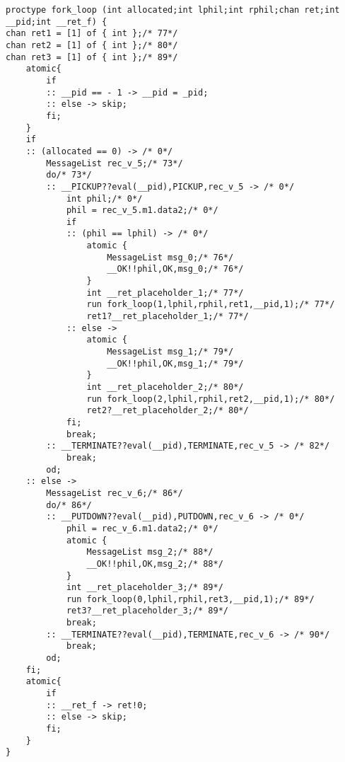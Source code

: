 \begin{lstlisting}[xleftmargin=.01\linewidth, xrightmargin=0.01\linewidth, caption={Dining Philosophers Promela translation.}, label={lst:promela_dp}]
proctype fork_loop (int allocated;int lphil;int rphil;chan ret;int __pid;int __ret_f) {
chan ret1 = [1] of { int };/* 77*/ 
chan ret2 = [1] of { int };/* 80*/ 
chan ret3 = [1] of { int };/* 89*/ 
	atomic{
		if
		:: __pid == - 1 -> __pid = _pid;
		:: else -> skip;
		fi;
	}
	if
	:: (allocated == 0) -> /* 0*/ 
		MessageList rec_v_5;/* 73*/ 
		do/* 73*/ 
		:: __PICKUP??eval(__pid),PICKUP,rec_v_5 -> /* 0*/ 
			int phil;/* 0*/ 
			phil = rec_v_5.m1.data2;/* 0*/ 
			if
			:: (phil == lphil) -> /* 0*/ 
				atomic {
					MessageList msg_0;/* 76*/ 
					__OK!!phil,OK,msg_0;/* 76*/ 
				}
				int __ret_placeholder_1;/* 77*/ 
				run fork_loop(1,lphil,rphil,ret1,__pid,1);/* 77*/ 
				ret1?__ret_placeholder_1;/* 77*/ 
			:: else -> 
				atomic {
					MessageList msg_1;/* 79*/ 
					__OK!!phil,OK,msg_1;/* 79*/ 
				}
				int __ret_placeholder_2;/* 80*/ 
				run fork_loop(2,lphil,rphil,ret2,__pid,1);/* 80*/ 
				ret2?__ret_placeholder_2;/* 80*/ 
			fi;
			break;
		:: __TERMINATE??eval(__pid),TERMINATE,rec_v_5 -> /* 82*/ 
			break;
		od;
	:: else -> 
		MessageList rec_v_6;/* 86*/ 
		do/* 86*/ 
		:: __PUTDOWN??eval(__pid),PUTDOWN,rec_v_6 -> /* 0*/ 
			phil = rec_v_6.m1.data2;/* 0*/ 
			atomic {
				MessageList msg_2;/* 88*/ 
				__OK!!phil,OK,msg_2;/* 88*/ 
			}
			int __ret_placeholder_3;/* 89*/ 
			run fork_loop(0,lphil,rphil,ret3,__pid,1);/* 89*/ 
			ret3?__ret_placeholder_3;/* 89*/ 
			break;
		:: __TERMINATE??eval(__pid),TERMINATE,rec_v_6 -> /* 90*/ 
			break;
		od;
	fi;
	atomic{
		if
		:: __ret_f -> ret!0;
		:: else -> skip;
		fi;
	}
}


\end{lstlisting}
